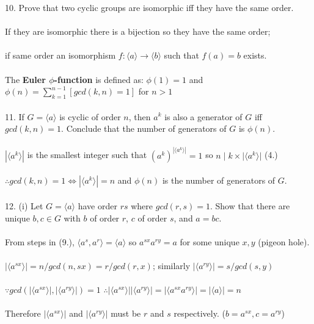 \documentclass{article}
\begin{document}
\begin{siderules}
\color{blue}10. Prove that two cyclic groups are isomorphic iff they have the same order.\\\\\color{black}
\null\qquad If they are isomorphic there is a bijection so they have the same order;\\\\
\null\qquad if same order an isomorphism \(f:\langle a\rangle\to\langle b\rangle\) such that \(f(a)=b\) exists.\\\\
\color{blue}The \textbf{Euler \(\phi\)-function} is defined as: \(\phi(1)=1\) and \(\phi(n)=\sum_{k=1}^{n-1}[gcd(k,n)=1]\) for \(n>1\)\color{black}\\\\
\color{blue}11. If \(G=\langle a\rangle\) is cyclic of order \(n\), then \(a^{k}\) is also a generator of \(G\) iff \(gcd(k,n)=1\). 
Conclude that the number of generators of \(G\) is \(\phi(n)\).\\\\\color{black}
\null\qquad \(|\langle a^{k}\rangle|\) is the smallest integer such that \((a^{k})^{|\langle a^{k}\rangle|}=1\) so \(n\;|\;k\times|\langle a^{k}\rangle|\) \color{gray}(4.)\\\\\color{black}
\null\qquad \(\therefore gcd(k,n)=1 \Longleftrightarrow |\langle a^{k}\rangle|=n\) and \(\phi(n)\) is the number of generators of \(G\).\\\\
\color{blue}12. (i) Let \(G=\langle a\rangle\) have order \(rs\) where \(gcd(r,s)=1\). Show that there are unique 
\(b,c\in G\) with \(b\) of order \(r\), \(c\) of order \(s\), and \(a=bc\).\\\\\color{black}
\null\qquad From \color{gray}steps in (9.)\color{black}, \(\langle a^{s}, a^{r}\rangle=\langle a\rangle\) so \(a^{sx}a^{ry}=a\) for some unique \(x,y\) (pigeon hole).\\\\
\null\qquad \(|\langle a^{sx}\rangle|={n}/{gcd(n, sx)}={r}/{gcd(r,x)}\); similarly \(|\langle a^{ry}\rangle|=s/gcd(s,y)\)\\\\
\null\qquad \(\because gcd(|\langle a^{sx}\rangle|,|\langle a^{ry}\rangle|)=1\) \(\therefore|\langle a^{sx}\rangle||\langle a^{ry}\rangle|=|\langle a^{sx}a^{ry}\rangle|=|\langle a\rangle|=n\)\\\\
\null\qquad Therefore \(|\langle a^{sx}\rangle|\) and \(|\langle a^{ry}\rangle|\) must be \(r\) and \(s\) respectively. (\(b=a^{sx},c=a^{ry}\))\\\\

\end{siderules}
\end{document}
